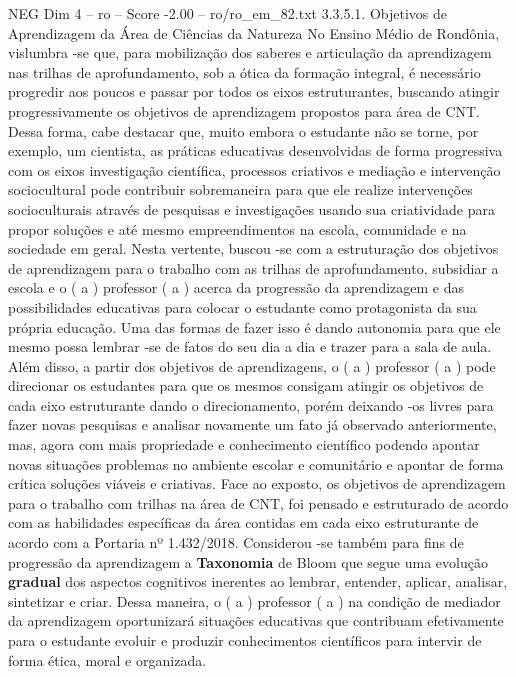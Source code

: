 \begin{textsample}{NEG Dim 4 – ro – Score -2.00 – ro/ro\_em\_82.txt}  \label{ex:f4_neg_078}
3.3.5.1.
Objetivos de Aprendizagem da Área de Ciências da Natureza No Ensino Médio de Rondônia, vislumbra -se que, para mobilização dos saberes e articulação da aprendizagem nas trilhas de aprofundamento, sob a ótica da formação integral, é necessário progredir aos poucos e passar por todos os eixos estruturantes, buscando atingir progressivamente os objetivos de aprendizagem propostos para área de CNT.
Dessa forma, cabe destacar que, muito embora o estudante não se torne, por exemplo, um cientista, as práticas educativas desenvolvidas de forma progressiva com os eixos investigação científica, processos criativos e mediação e intervenção sociocultural pode contribuir sobremaneira para que ele realize intervenções socioculturais através de pesquisas e investigações usando sua criatividade para propor soluções e até mesmo empreendimentos na escola, comunidade e na sociedade em geral.
Nesta vertente, buscou -se com a estruturação dos objetivos de aprendizagem para o trabalho com as trilhas de aprofundamento, subsidiar a escola e o ( a ) professor ( a ) acerca da progressão da aprendizagem e das possibilidades educativas para colocar o estudante como protagonista da sua própria educação.
Uma das formas de fazer isso é dando autonomia para que ele mesmo possa lembrar -se de fatos do seu dia a dia e trazer para a sala de aula.
Além disso, a partir dos objetivos de aprendizagens, o ( a ) professor ( a ) pode direcionar os estudantes para que os mesmos consigam atingir os objetivos de cada eixo estruturante dando o direcionamento, porém deixando -os livres para fazer novas pesquisas e analisar novamente um fato já observado anteriormente, mas, agora com mais propriedade e conhecimento científico podendo apontar novas situações problemas no ambiente escolar e comunitário e apontar de forma crítica soluções viáveis e criativas.
Face ao exposto, os objetivos de aprendizagem para o trabalho com trilhas na área de CNT, foi pensado e estruturado de acordo com as habilidades específicas da área contidas em cada eixo estruturante de acordo com a Portaria nº 1.432/2018.
Considerou -se também para fins de progressão da aprendizagem a \textbf{Taxonomia} de Bloom que segue uma evolução \textbf{gradual} dos aspectos cognitivos inerentes ao lembrar, entender, aplicar, analisar, sintetizar e criar.
Dessa maneira, o ( a ) professor ( a ) na condição de mediador da aprendizagem oportunizará situações educativas que contribuam efetivamente para o estudante evoluir e produzir conhecimentos científicos para intervir de forma ética, moral e organizada.

\end{textsample}
